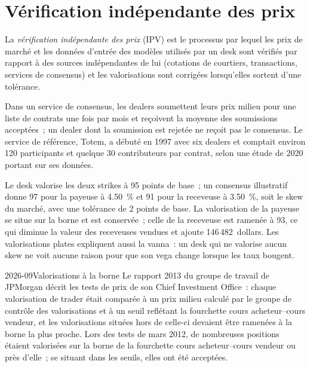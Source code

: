 \section{Vérification indépendante des prix}

\begin{definition}\label{def:rc:pnl-explain-and-independent-price-verification:ipv}
La \emph{vérification indépendante des prix} (IPV) est le processus par
lequel les prix de marché et les données d'entrée des modèles utilisés par un desk sont vérifiés par rapport à des sources indépendantes de lui
(cotations de courtiers, transactions, services de consensus) et les valorisations sont corrigées lorsqu'elles sortent d'une
tolérance.
\end{definition}

Dans un service de consensus, les dealers soumettent leurs prix milieu pour une liste de contrats une fois par mois et reçoivent
la moyenne des soumissions acceptées~; un dealer dont la soumission est rejetée ne reçoit pas le
consensus. Le service de référence, Totem, a débuté en 1997 avec six dealers et comptait environ 120 participants et quelque 30
contributeurs par contrat, selon une étude de 2020 portant sur ses données.

\label{lst:rc:pnl-explain-and-independent-price-verification:ipv}

\begin{example}\label{ex:rc:pnl-explain-and-independent-price-verification:ipv}
Le desk valorise les deux strikes à 95 points de base~; un consensus illustratif donne 97 pour la payeuse à 4.50~\%
et 91 pour la receveuse à 3.50~\%, soit le skew du marché, avec une tolérance de 2 points de base. La valorisation de la payeuse
se situe sur la borne et est conservée~; celle de la receveuse est ramenée à 93, ce qui diminue la valeur des receveuses vendues et ajoute 146\,482~dollars.
Les valorisations plates expliquent aussi la vanna~: un desk qui ne valorise aucun skew ne voit
aucune raison pour que son vega change lorsque les taux bougent.
\end{example}

\begin{dated}{2026-09}{Valorisations à la borne}\label{dat:rc:pnl-explain-and-independent-price-verification:cio}
Le rapport 2013 du groupe de travail de JPMorgan décrit les tests de prix de son Chief Investment Office~: chaque valorisation de trader
était comparée à un prix milieu calculé par le groupe de contrôle des valorisations et à un seuil reflétant
la fourchette cours acheteur--cours vendeur, et les valorisations situées hors de celle-ci devaient être ramenées à la borne la plus proche. Lors des tests de mars 2012,
de nombreuses positions étaient valorisées sur la borne de la fourchette cours acheteur--cours vendeur ou près d'elle~; se situant dans les
seuils, elles ont été acceptées.
\end{dated}


